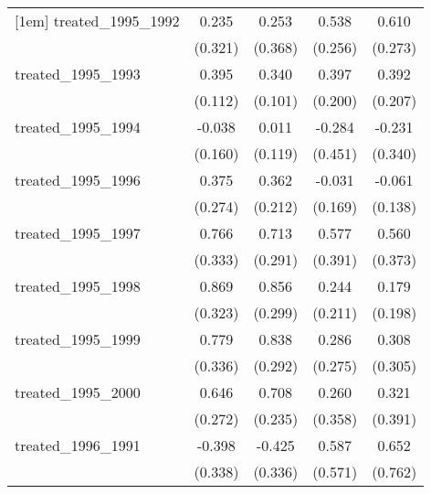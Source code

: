 {\begin{tabular}{l*{4}{c}}
[1em]
treated\_1995\_1992&       0.235         &       0.253         &       0.538\sym{*}  &       0.610\sym{*}  \\
            &     (0.321)         &     (0.368)         &     (0.256)         &     (0.273)         \\
[1em]
treated\_1995\_1993&       0.395\sym{***}&       0.340\sym{***}&       0.397\sym{*}  &       0.392         \\
            &     (0.112)         &     (0.101)         &     (0.200)         &     (0.207)         \\
[1em]
treated\_1995\_1994&      -0.038         &       0.011         &      -0.284         &      -0.231         \\
            &     (0.160)         &     (0.119)         &     (0.451)         &     (0.340)         \\
[1em]
treated\_1995\_1996&       0.375         &       0.362         &      -0.031         &      -0.061         \\
            &     (0.274)         &     (0.212)         &     (0.169)         &     (0.138)         \\
[1em]
treated\_1995\_1997&       0.766\sym{*}  &       0.713\sym{*}  &       0.577         &       0.560         \\
            &     (0.333)         &     (0.291)         &     (0.391)         &     (0.373)         \\
[1em]
treated\_1995\_1998&       0.869\sym{**} &       0.856\sym{**} &       0.244         &       0.179         \\
            &     (0.323)         &     (0.299)         &     (0.211)         &     (0.198)         \\
[1em]
treated\_1995\_1999&       0.779\sym{*}  &       0.838\sym{**} &       0.286         &       0.308         \\
            &     (0.336)         &     (0.292)         &     (0.275)         &     (0.305)         \\
[1em]
treated\_1995\_2000&       0.646\sym{*}  &       0.708\sym{**} &       0.260         &       0.321         \\
            &     (0.272)         &     (0.235)         &     (0.358)         &     (0.391)         \\
[1em]
treated\_1996\_1991&      -0.398         &      -0.425         &       0.587         &       0.652         \\
            &     (0.338)         &     (0.336)         &     (0.571)         &     (0.762)         \\

\end{tabular}}
